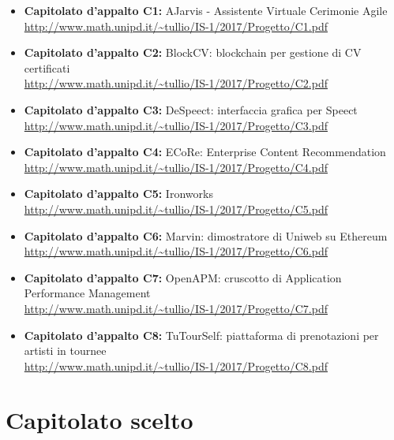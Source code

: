 \documentclass[openany,12pt,a4paper]{report}
\begin{document}
	\begin{itemize}
		\item \textbf{Capitolato d'appalto C1:} AJarvis - Assistente Virtuale Cerimonie Agile \\ \url{http://www.math.unipd.it/~tullio/IS-1/2017/Progetto/C1.pdf}

		\item \textbf{Capitolato d'appalto C2:} BlockCV: blockchain per gestione di CV certificati \\ \url{http://www.math.unipd.it/~tullio/IS-1/2017/Progetto/C2.pdf}

		\item \textbf{Capitolato d'appalto C3:} DeSpeect: interfaccia grafica per Speect \\ \url{http://www.math.unipd.it/~tullio/IS-1/2017/Progetto/C3.pdf}

		\item \textbf{Capitolato d'appalto C4:} ECoRe: Enterprise Content Recommendation \\ \url{http://www.math.unipd.it/~tullio/IS-1/2017/Progetto/C4.pdf}

		\item \textbf{Capitolato d'appalto C5:} Ironworks \\ \url{http://www.math.unipd.it/~tullio/IS-1/2017/Progetto/C5.pdf}

		\item \textbf{Capitolato d'appalto C6:} Marvin: dimostratore di Uniweb su Ethereum \\ \url{http://www.math.unipd.it/~tullio/IS-1/2017/Progetto/C6.pdf}

		\item \textbf{Capitolato d'appalto C7:} OpenAPM: cruscotto di Application Performance Management \\ \url{http://www.math.unipd.it/~tullio/IS-1/2017/Progetto/C7.pdf}

		\item \textbf{Capitolato d'appalto C8:} TuTourSelf: piattaforma di prenotazioni per artisti in tournee \\ \url{http://www.math.unipd.it/~tullio/IS-1/2017/Progetto/C8.pdf}
	\end{itemize}


	\chapter{Capitolato scelto}
\end{document}
